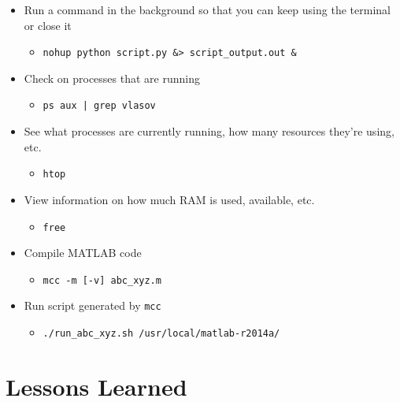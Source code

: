 \documentclass[11pt,a4paper]{report}
\begin{document}
\begin{itemize}

\item Run a command in the background so that you can keep using the terminal or close it
  \begin{itemize}
  \item \texttt{nohup python script.py \&> script\_output.out \&}
  \end{itemize}

\item Check on processes that are running
  \begin{itemize}
  \item \texttt{ps aux | grep vlasov}
  \end{itemize}

\item See what processes are currently running, how many resources they're using, etc.
  \begin{itemize}
  \item \texttt{htop}
  \end{itemize}

\item View information on how much RAM is used, available, etc.
  \begin{itemize}
  \item \texttt{free}
  \end{itemize}

\item Compile MATLAB code
  \begin{itemize}
  \item \texttt{mcc -m [-v] abc\_xyz.m}
  \end{itemize}

\item Run script generated by \texttt{mcc}
  \begin{itemize}
  \item \texttt{./run\_abc\_xyz.sh /usr/local/matlab-r2014a/}
  \end{itemize}

\end{itemize}


\section{Lessons Learned}
\label{sec:lessons-learned}
\end{document}
